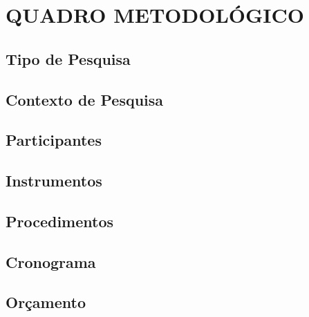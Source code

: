 \chapter{QUADRO METODOLÓGICO}
\label{cap:quadroMetodologico}
\section{Tipo de Pesquisa}
\section{Contexto de Pesquisa}
\section{Participantes}
\section{Instrumentos}
\section{Procedimentos}
\section{Cronograma}
\section{Orçamento}